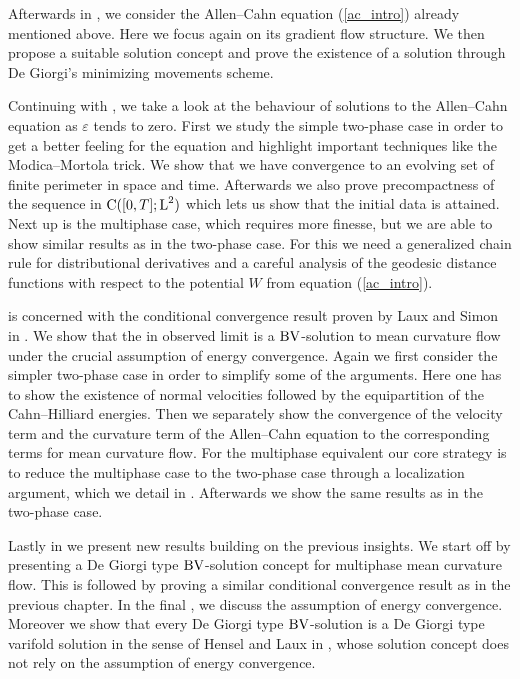 Afterwards in , we consider the Allen--Cahn 
equation 
(\ref{ac_intro}) already mentioned above. Here we focus again on its 
gradient flow structure. We then propose a suitable solution concept and prove 
the existence of a solution through De Giorgi's minimizing movements scheme.

Continuing with , we take a 
look at the behaviour of solutions to the Allen--Cahn equation as $ 
\varepsilon $ tends to zero. First we study the simple two-phase case in 
order 
to get a better feeling for the equation and highlight important techniques 
like the Modica--Mortola trick. We show that we have convergence to an 
evolving set of finite perimeter in space and time. 
Afterwards we also prove 
precompactness of the sequence in $ \operatorname{C} ( [ 0 , T ] ; \operatorname{L}^{ 2 } ) $ which 
lets us show that the initial data is attained. 
Next up is the multiphase case, 
which requires more finesse, but we are able to show similar results as 
in the 
two-phase case. 
For this we need a generalized chain rule for distributional 
derivatives and a careful analysis of the geodesic distance functions with 
respect to the potential $ W $ from equation (\ref{ac_intro}).

 is concerned with the conditional 
convergence result proven by Laux and Simon in 
\cite{convergence_of_allen_cahn_equation_to_multiphase_mean_curvature_flow}. 
We show that the in  
observed limit is a $ \operatorname{BV} $-solution to mean curvature flow under the crucial 
assumption of energy convergence. 
Again we first consider the simpler two-phase case in 
order to simplify some of the arguments. Here one has to show the existence of 
normal velocities followed by the equipartition of the Cahn--Hilliard energies. 
Then we separately show the convergence of the velocity term and the curvature 
term 
of the Allen--Cahn equation to the corresponding terms for mean curvature flow. 
For the multiphase equivalent our core strategy is to reduce the 
multiphase case to the two-phase 
case through a localization argument, which we detail in 
. 
Afterwards we show the same results as in the two-phase case.

Lastly in  we present new results 
building on the previous insights. We start off by presenting a De Giorgi type 
$ \operatorname{BV} $-solution concept for multiphase mean curvature flow. This is followed 
by proving a similar conditional convergence result as in the previous chapter. 
In the final 
, we discuss the 
assumption of energy convergence. Moreover we show that every De 
Giorgi type $ \operatorname{BV} $-solution is a De Giorgi type varifold solution in the sense 
of Hensel and Laux in 
\cite{hensel_laux_varifold_solution_concept_for_mean_curvature_flow}, whose 
solution concept does not rely on the assumption of energy convergence.






